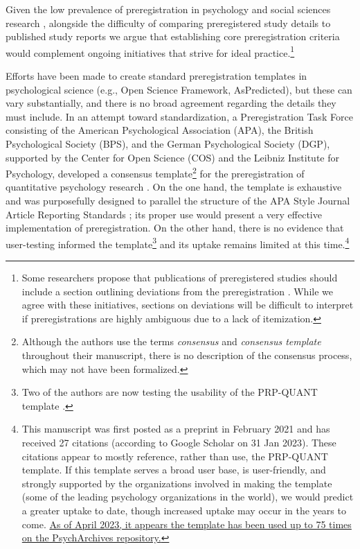 \documentclass[authordate, meta]{jote-new-article}
\begin{document}
Given the low prevalence of preregistration in psychology and social sciences research \parencites{Hardwicke2020}{Hardwicke2021}{Scoggins2023}, alongside the difficulty of comparing preregistered study details to published study reports \parencites{TARG2022}{vandenAkker2022} we argue that establishing core preregistration criteria would complement ongoing initiatives that strive for ideal practice.\footnote{Some researchers propose that publications of preregistered studies should include a section outlining deviations from the preregistration \parencites[e.g.,][]{Campbell2019}. While we agree with these initiatives, sections on deviations will be difficult to interpret if preregistrations are highly ambiguous due to a lack of itemization. }







Efforts have been made to create standard preregistration templates in psychological science (e.g., Open Science Framework, AsPredicted), but these can vary substantially, and there is no broad agreement regarding the details they must include. In an attempt toward standardization, a Preregistration Task Force consisting of the American Psychological Association (APA), the British Psychological Society (BPS), and the German Psychological Society (DGP), supported by the Center for Open Science (COS) and the Leibniz Institute for Psychology, developed a consensus template\footnote{Although the authors use the terms \emph{consensus }and \emph{consensus template} throughout their manuscript, there is no description of the consensus process, which may not have been formalized.} for the preregistration of quantitative psychology research \parencites[the PRP-QUANT template;][]{Bosnjak2022}. On the one hand, the template is exhaustive and was purposefully designed to parallel the structure of the APA Style Journal Article Reporting Standards \parencites{Appelbaum2018}; its proper use would present a very effective implementation of preregistration. On the other hand, there is no evidence that user-testing informed the template\footnote{ Two of the authors are now testing the usability of the PRP-QUANT template \parencites[preregistration:][]{Spitzer2021}.} and its uptake remains limited at this time.\footnote{ This manuscript was first posted as a preprint in February 2021 and has received 27 citations (according to Google Scholar on 31 Jan 2023). These citations appear to mostly reference, rather than use, the PRP-QUANT template. If this template serves a broad user base, is user-friendly, and strongly supported by the organizations involved in making the template (some of the leading psychology organizations in the world), we would predict a greater uptake to date, though increased uptake may occur in the years to come. \href{https://www.psycharchives.org/en/browse/?q=zpid.tags.visible\%3APRP-QUANT}{As of April 2023, it appears the template has been used up to 75 times on the PsychArchives repository.} }
\end{document}
